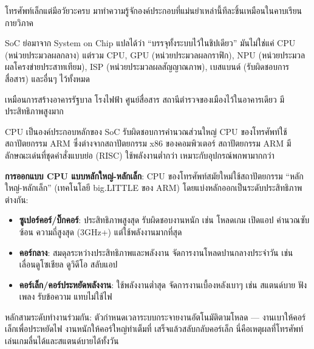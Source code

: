


โทรศัพท์เล็กแต่มีอวัยวะครบ มาทำความรู้จักองค์ประกอบที่แม่นยำเหล่านี้ทีละชิ้นเหมือนในคาบเรียนกายวิภาค


SoC ย่อมาจาก System on Chip แปลได้ว่า “บรรจุทั้งระบบไว้ในชิปเดียว” มันไม่ใช่แค่ CPU (หน่วยประมวลผลกลาง) แต่รวม CPU, GPU (หน่วยประมวลผลกราฟิก), NPU (หน่วยประมวลผลโครงข่ายประสาทเทียม), ISP (หน่วยประมวลผลสัญญาณภาพ), เบสแบนด์ (รับผิดชอบการสื่อสาร) และอื่นๆ ไว้ทั้งหมด

เหมือนการสร้างอาคารรัฐบาล โรงไฟฟ้า ศูนย์สื่อสาร สถานีตำรวจของเมืองไว้ในอาคารเดียว มีประสิทธิภาพสูงมาก


CPU เป็นองค์ประกอบหลักของ SoC รับผิดชอบการคำนวณส่วนใหญ่ CPU ของโทรศัพท์ใช้สถาปัตยกรรม ARM ซึ่งต่างจากสถาปัตยกรรม x86 ของคอมพิวเตอร์ สถาปัตยกรรม ARM มีลักษณะเด่นที่ชุดคำสั่งแบบย่อ (RISC) ใช้พลังงานต่ำกว่า เหมาะกับอุปกรณ์พกพามากกว่า

\textbf{การออกแบบ CPU แบบหลักใหญ่-หลักเล็ก}: CPU ของโทรศัพท์สมัยใหม่ใช้สถาปัตยกรรม “หลักใหญ่-หลักเล็ก” (เทคโนโลยี big.LITTLE ของ ARM) โดยแบ่งหลักออกเป็นระดับประสิทธิภาพต่างกัน:

\begin{itemize}
  \item \textbf{ซูเปอร์คอร์/บิ๊กคอร์}: ประสิทธิภาพสูงสุด รับผิดชอบงานหนัก เช่น โหลดเกม เปิดแอป คำนวณซับซ้อน ความถี่สูงสุด (3GHz+) แต่ใช้พลังงานมากที่สุด
  \item \textbf{คอร์กลาง}: สมดุลระหว่างประสิทธิภาพและพลังงาน จัดการงานโหลดปานกลางประจำวัน เช่น เลื่อนดูโซเชียล ดูวิดีโอ สลับแอป
  \item \textbf{คอร์เล็ก/คอร์ประหยัดพลังงาน}: ใช้พลังงานต่ำสุด จัดการงานเบื้องหลังเบาๆ เช่น สแตนด์บาย ฟังเพลง รับข้อความ แทบไม่ใช้ไฟ
\end{itemize}

หลักสามระดับทำงานร่วมกัน: ตัวกำหนดเวลาระบบกระจายงานอัตโนมัติตามโหลด — งานเบาให้คอร์เล็กเพื่อประหยัดไฟ งานหนักให้คอร์ใหญ่ทำเต็มที่ เสร็จแล้วสลับกลับคอร์เล็ก นี่คือเหตุผลที่โทรศัพท์เล่นเกมลื่นได้และสแตนด์บายได้ทั้งวัน

